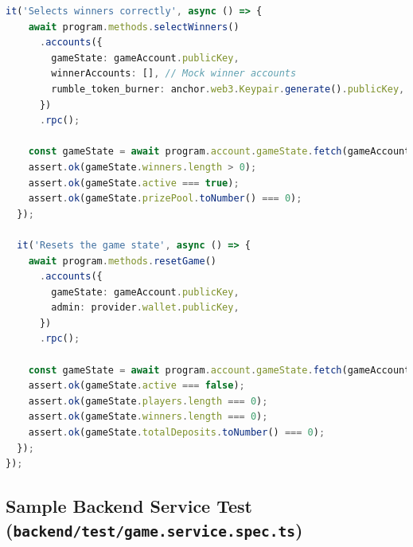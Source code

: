 \documentclass[11pt,a4paper]{article}
\begin{document}
\begin{lstlisting}[language=TypeScript, caption={Smart Contract Test}]
  it('Selects winners correctly', async () => {
    await program.methods.selectWinners()
      .accounts({
        gameState: gameAccount.publicKey,
        winnerAccounts: [], // Mock winner accounts
        rumble_token_burner: anchor.web3.Keypair.generate().publicKey,
      })
      .rpc();

    const gameState = await program.account.gameState.fetch(gameAccount.publicKey);
    assert.ok(gameState.winners.length > 0);
    assert.ok(gameState.active === true);
    assert.ok(gameState.prizePool.toNumber() === 0);
  });

  it('Resets the game state', async () => {
    await program.methods.resetGame()
      .accounts({
        gameState: gameAccount.publicKey,
        admin: provider.wallet.publicKey,
      })
      .rpc();

    const gameState = await program.account.gameState.fetch(gameAccount.publicKey);
    assert.ok(gameState.active === false);
    assert.ok(gameState.players.length === 0);
    assert.ok(gameState.winners.length === 0);
    assert.ok(gameState.totalDeposits.toNumber() === 0);
  });
});
\end{lstlisting}

\subsection{Sample Backend Service Test (\texttt{backend/test/game.service.spec.ts})}
\end{document}
